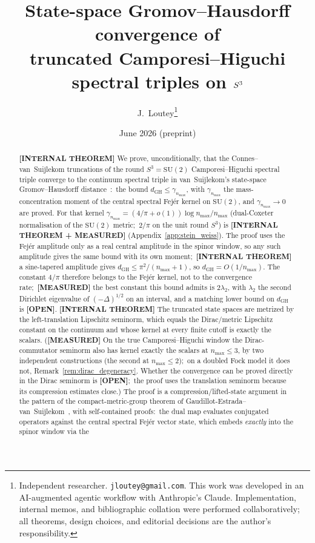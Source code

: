 \documentclass[11pt,a4paper]{article}
\title{State-space Gromov--Hausdorff convergence of \\
truncated Camporesi--Higuchi spectral triples on $\sthree$}
\author{J.~Loutey\thanks{Independent researcher. \texttt{jloutey@gmail.com}.
This work was developed in an AI-augmented agentic workflow with
Anthropic's Claude. Implementation, internal memos, and bibliographic
collation were performed collaboratively; all theorems, design choices,
and editorial decisions are the author's responsibility.}}
\date{June 2026 (preprint)}
\theoremstyle{plain}
\theoremstyle{definition}
\newcommand{\nmax}{n_{\max}}
\newcommand{\sthree}{S^{3}}
\newcommand{\SU}{\mathrm{SU}}
\begin{document}
\maketitle

\begin{abstract}
\textbf{[INTERNAL THEOREM]} We prove, unconditionally, that the
Connes--van~Suijlekom
truncations of the round $\sthree = \SU(2)$ Camporesi--Higuchi
spectral triple converge to the continuum spectral triple in
van~Suijlekom's state-space Gromov--Hausdorff
distance~\cite{vs2021_jgp}:\ the bound $d_{\mathrm{GH}} \le \gamma_{\nmax}$, with $\gamma_{\nmax}$ the mass-concentration moment of the central spectral Fej\'er kernel on $\SU(2)$, and $\gamma_{\nmax} \to 0$ are proved.  For that kernel
\(
\gamma_{\nmax}
= (4/\pi + o(1)) \log \nmax / \nmax
\)
(dual-Coxeter normalisation of the $\SU(2)$ metric;\ $2/\pi$ on the unit round $\sthree$) is \textbf{[INTERNAL THEOREM + MEASURED]} (Appendix~\ref{app:stein_weiss}).  The proof uses the Fej\'er amplitude only as a real central amplitude in the spinor window, so any such amplitude gives the same bound with its own moment;\ \textbf{[INTERNAL THEOREM]} a sine-tapered amplitude gives $d_{\mathrm{GH}} \le \pi^2/(\nmax+1)$, so $d_{\mathrm{GH}} = O(1/\nmax)$.  The constant $4/\pi$ therefore belongs to the Fej\'er kernel, not to the convergence rate;\ \textbf{[MEASURED]} the best constant this bound admits is $2\lambda_2$, with $\lambda_2$ the second Dirichlet eigenvalue of $(-\Delta)^{1/2}$ on an interval, and a matching lower bound on $d_{\mathrm{GH}}$ is \textbf{[OPEN]}.
\textbf{[INTERNAL THEOREM]} The truncated state spaces are metrized
by the left-translation
Lipschitz seminorm, which equals the Dirac/metric Lipschitz constant
on the continuum and whose kernel at every finite cutoff is exactly
the scalars. (\textbf{[MEASURED]} On the true Camporesi--Higuchi
window the Dirac-commutator seminorm also has kernel exactly the
scalars at $\nmax \le 3$, by two independent constructions (the second
at $\nmax \le 2$);\ on a doubled Fock model it does not,
Remark~\ref{rem:dirac_degeneracy}. Whether the convergence can be
proved directly in the Dirac seminorm is \textbf{[OPEN]};\ the proof
uses the translation seminorm because its compression estimates
close.) The proof
is a compression/lifted-state argument in the pattern of the
compact-metric-group theorem of
Gaudillot-Estrada--van~Suijlekom~\cite{gaudillot_vs2025}, with
self-contained proofs:\ the dual map evaluates conjugated operators
against the central spectral Fej\'er vector state, which embeds
\emph{exactly} into the spinor window via the

\end{abstract}
\end{document}
